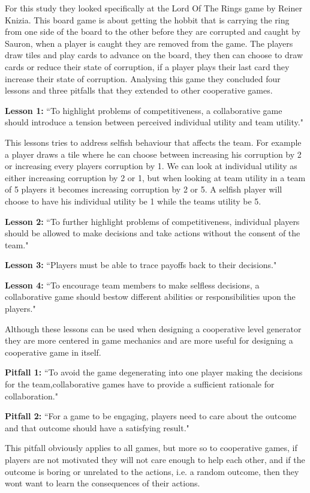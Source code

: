 \documentclass[runningheads]{llncs}
\begin{document}
For this study they looked specifically at the Lord Of The Rings game by Reiner Knizia. This board game is about getting the hobbit that is carrying the ring from one side of the board to the other before they are corrupted and caught by Sauron, when a player is caught they are removed from the game. The players draw tiles and play cards to advance on the board, they then can choose to draw cards or reduce their state of corruption, if a player plays their last card they increase their state of corruption. Analysing this game they concluded four lessons and three pitfalls that they extended to other cooperative games.

\textbf{Lesson 1:} ``To highlight problems of competitiveness, a collaborative game should introduce a tension between perceived individual utility and team utility."

This lessons tries to address selfish behaviour that affects the team. For example a player draws a tile where he can choose between increasing his corruption by 2 or increasing every players corruption by 1. We can look at individual utility as either increasing corruption by 2 or 1, but when looking at team utility in a team of 5 players it becomes increasing corruption by 2 or 5. A selfish player will choose to have his individual utility be 1 while the teams utility be 5.

\textbf{Lesson 2:} ``To further highlight problems of competitiveness, individual players should be allowed to make decisions and take actions without the consent of the team."

\textbf{Lesson 3:} ``Players must be able to trace payoffs back to their decisions."

\textbf{Lesson 4:} ``To encourage team members to make selfless decisions, a collaborative game should bestow different abilities or responsibilities upon the players."

Although these lessons can be used when designing a cooperative level generator they are more centered in game mechanics and are more useful for designing a cooperative game in itself.

\textbf{Pitfall 1:} ``To avoid the game degenerating into one player making the decisions for the team,collaborative games have to provide a sufficient rationale for collaboration."

\textbf{Pitfall 2:} ``For a game to be engaging, players need to care about the outcome and that outcome should have a satisfying result."

This pitfall obviously applies to all games, but more so to cooperative games, if players are not motivated they will not care enough to help each other, and if the outcome is boring or unrelated to the actions, i.e. a random outcome, then they wont want to learn the consequences of their actions.
\end{document}
